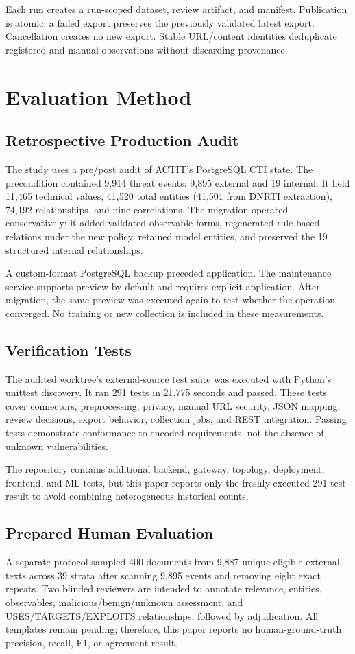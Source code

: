 \documentclass[conference]{IEEEtran}
\begin{document}
Each run creates a run-scoped dataset, review artifact, and manifest. Publication is atomic: a failed export preserves the previously validated latest export. Cancellation creates no new export. Stable URL/content identities deduplicate registered and manual observations without discarding provenance.

\section{Evaluation Method}
\subsection{Retrospective Production Audit}
The study uses a pre/post audit of ACTIT's PostgreSQL CTI state. The precondition contained 9,914 threat events: 9,895 external and 19 internal. It held 11,465 technical values, 41,520 total entities (41,501 from DNRTI extraction), 74,192 relationships, and nine correlations. The migration operated conservatively: it added validated observable forms, regenerated rule-based relations under the new policy, retained model entities, and preserved the 19 structured internal relationships.

A custom-format PostgreSQL backup preceded application. The maintenance service supports preview by default and requires explicit application. After migration, the same preview was executed again to test whether the operation converged. No training or new collection is included in these measurements.

\subsection{Verification Tests}
The audited worktree's external-source test suite was executed with Python's unittest discovery. It ran 291 tests in 21.775 seconds and passed. These tests cover connectors, preprocessing, privacy, manual URL security, JSON mapping, review decisions, export behavior, collection jobs, and REST integration. Passing tests demonstrate conformance to encoded requirements, not the absence of unknown vulnerabilities.

The repository contains additional backend, gateway, topology, deployment, frontend, and ML tests, but this paper reports only the freshly executed 291-test result to avoid combining heterogeneous historical counts.

\subsection{Prepared Human Evaluation}
A separate protocol sampled 400 documents from 9,887 unique eligible external texts across 39 strata after scanning 9,895 events and removing eight exact repeats. Two blinded reviewers are intended to annotate relevance, entities, observables, malicious/benign/unknown assessment, and USES/TARGETS/EXPLOITS relationships, followed by adjudication. All templates remain pending; therefore, this paper reports no human-ground-truth precision, recall, F1, or agreement result.
\end{document}
